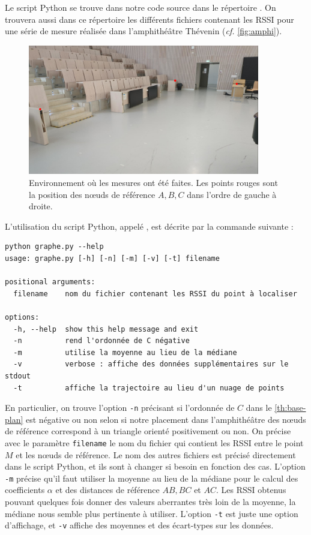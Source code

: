 \documentclass[french, a4paper, 12pt, parskip]{scrartcl}
\begin{document}
Le script Python se trouve dans notre code source dans le répertoire
. On trouvera aussi dans ce répertoire les
différents fichiers contenant les RSSI pour une série de mesure réalisée dans
l'amphithéâtre Thévenin (\textit{cf.} \autoref{fig:amphi}).

\begin{figure}[h!]
    \centering
    \includegraphics[width=0.9\textwidth]{amphi-rouge.jpeg}
    \caption{Environnement où les mesures ont été faites. Les points rouges
    sont la position des nœuds de référence $A, B, C$ dans l'ordre de gauche à
    droite.}
    \label{fig:amphi}
\end{figure}

L'utilisation du script Python, appelé , est décrite par la
commande suivante :
\begin{verbatim}
python graphe.py --help
usage: graphe.py [-h] [-n] [-m] [-v] [-t] filename

positional arguments:
  filename    nom du fichier contenant les RSSI du point à localiser

options:
  -h, --help  show this help message and exit
  -n          rend l'ordonnée de C négative
  -m          utilise la moyenne au lieu de la médiane
  -v          verbose : affiche des données supplémentaires sur le stdout
  -t          affiche la trajectoire au lieu d'un nuage de points
\end{verbatim}

En particulier, on trouve l'option \verb+-n+ précisant si l'ordonnée de $C$ dans
le \autoref{th:base-plan} est négative ou non selon si notre placement dans
l'amphithéâtre des nœuds de référence correspond à un triangle orienté
positivement ou non. On précise avec le paramètre \verb+filename+ le nom du
fichier qui contient les RSSI entre le point $M$ et les nœuds de référence. Le
nom des autres fichiers est précisé directement dans le script Python, et ils
sont à changer si besoin en fonction des cas. L'option \verb+-m+ précise qu'il
faut utiliser la moyenne au lieu de la médiane pour le calcul des coefficients
$\alpha$ et des distances de référence $AB, BC$ et $AC$. Les RSSI obtenus
pouvant quelques fois donner des valeurs aberrantes très loin de la moyenne, la
médiane nous semble plus pertinente à utiliser. L'option \verb+-t+ est juste une
option d'affichage, et \verb+-v+ affiche des moyennes et des écart-types sur les
données.
\end{document}
